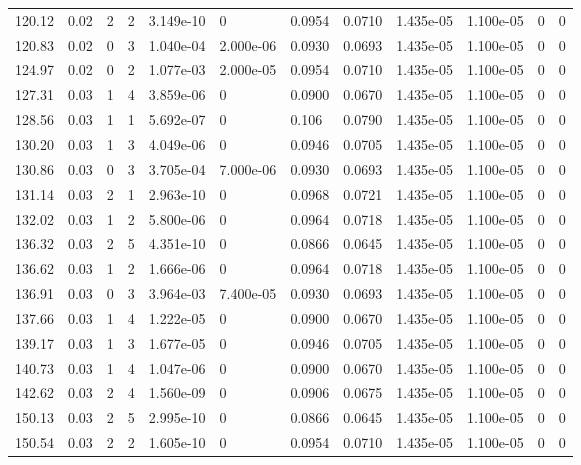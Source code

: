 \documentclass[preview]{standalone}
\begin{document}
{{{\begin{tabular}{L{1.2cm}C{1.2cm} C{0.3cm}C{0.5cm} C{1.4cm}C{1.4cm} C{1.4cm}C{1.4cm} C{1.6cm}C{1.6cm} C{1.6cm}C{1.6cm}}
  120.12  &  0.02  & 2     &  2 &  3.149e-10  & 0  &  0.0954&   0.0710& 1.435e-05 & 1.100e-05   &  0 & 0  \\ 
  120.83  &  0.02  & 0     &  3 &  1.040e-04  & 2.000e-06  &  0.0930&   0.0693& 1.435e-05 & 1.100e-05   &  0 & 0  \\ 
  124.97  &  0.02  & 0     &  2 &  1.077e-03  & 2.000e-05  &  0.0954&   0.0710& 1.435e-05 & 1.100e-05   &  0 & 0  \\ 
  127.31  &  0.03  & 1     &  4 &  3.859e-06  & 0  &  0.0900&   0.0670& 1.435e-05 & 1.100e-05   &  0 & 0  \\ 
  128.56  &  0.03  & 1     &  1 &  5.692e-07  & 0  &  0.106&   0.0790& 1.435e-05 & 1.100e-05   &  0 & 0  \\ 
  130.20  &  0.03  & 1     &  3 &  4.049e-06  & 0  &  0.0946&   0.0705& 1.435e-05 & 1.100e-05   &  0 & 0  \\ 
  130.86  &  0.03  & 0     &  3 &  3.705e-04  & 7.000e-06  &  0.0930&   0.0693& 1.435e-05 & 1.100e-05   &  0 & 0  \\ 
  131.14  &  0.03  & 2     &  1 &  2.963e-10  & 0  &  0.0968&   0.0721& 1.435e-05 & 1.100e-05   &  0 & 0  \\ 
  132.02  &  0.03  & 1     &  2 &  5.800e-06  & 0  &  0.0964&   0.0718& 1.435e-05 & 1.100e-05   &  0 & 0  \\ 
  136.32  &  0.03  & 2     &  5 &  4.351e-10  & 0  &  0.0866&   0.0645& 1.435e-05 & 1.100e-05   &  0 & 0  \\ 
  136.62  &  0.03  & 1     &  2 &  1.666e-06  & 0  &  0.0964&   0.0718& 1.435e-05 & 1.100e-05   &  0 & 0  \\ 
  136.91  &  0.03  & 0     &  3 &  3.964e-03  & 7.400e-05  &  0.0930&   0.0693& 1.435e-05 & 1.100e-05   &  0 & 0  \\ 
  137.66  &  0.03  & 1     &  4 &  1.222e-05  & 0  &  0.0900&   0.0670& 1.435e-05 & 1.100e-05   &  0 & 0  \\ 
  139.17  &  0.03  & 1     &  3 &  1.677e-05  & 0  &  0.0946&   0.0705& 1.435e-05 & 1.100e-05   &  0 & 0  \\ 
  140.73  &  0.03  & 1     &  4 &  1.047e-06  & 0  &  0.0900&   0.0670& 1.435e-05 & 1.100e-05   &  0 & 0  \\ 
  142.62  &  0.03  & 2     &  4 &  1.560e-09  & 0  &  0.0906&   0.0675& 1.435e-05 & 1.100e-05   &  0 & 0  \\ 
  150.13  &  0.03  & 2     &  5 &  2.995e-10  & 0  &  0.0866&   0.0645& 1.435e-05 & 1.100e-05   &  0 & 0  \\ 
  150.54  &  0.03  & 2     &  2 &  1.605e-10  & 0  &  0.0954&   0.0710& 1.435e-05 & 1.100e-05   &  0 & 0  \\ 

\end{tabular}}}}
\end{document}
